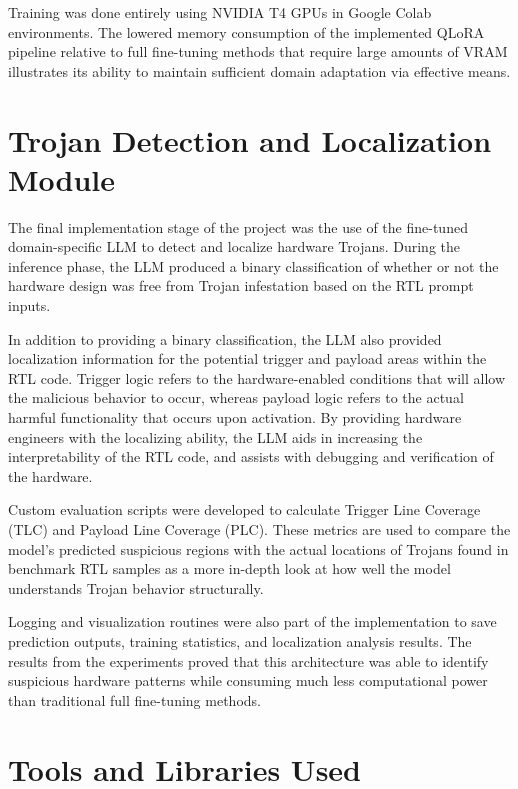 \documentclass[12pt,a4paper]{report}
\begin{document}
Training was done entirely using NVIDIA T4 GPUs in Google Colab environments. The lowered memory consumption of the implemented QLoRA pipeline relative to full fine-tuning methods that require large amounts of VRAM illustrates its ability to maintain sufficient domain adaptation via effective means.


\section{Trojan Detection and Localization Module}

The final implementation stage of the project was the use of the fine-tuned domain-specific LLM to detect and localize hardware Trojans. During the inference phase, the LLM produced a binary classification of whether or not the hardware design was free from Trojan infestation based on the RTL prompt inputs.

In addition to providing a binary classification, the LLM also provided localization information for the potential trigger and payload areas within the RTL code. Trigger logic refers to the hardware-enabled conditions that will allow the malicious behavior to occur, whereas payload logic refers to the actual harmful functionality that occurs upon activation. By providing hardware engineers with the localizing ability, the LLM aids in increasing the interpretability of the RTL code, and assists with debugging and verification of the hardware.

Custom evaluation scripts were developed to calculate Trigger Line Coverage (TLC) and Payload Line Coverage (PLC). These metrics are used to compare the model's predicted suspicious regions with the actual locations of Trojans found in benchmark RTL samples as a more in-depth look at how well the model understands Trojan behavior structurally.

Logging and visualization routines were also part of the implementation to save prediction outputs, training statistics, and localization analysis results. The results from the experiments proved that this architecture was able to identify suspicious hardware patterns while consuming much less computational power than traditional full fine-tuning methods.

\section{Tools and Libraries Used}
\end{document}
